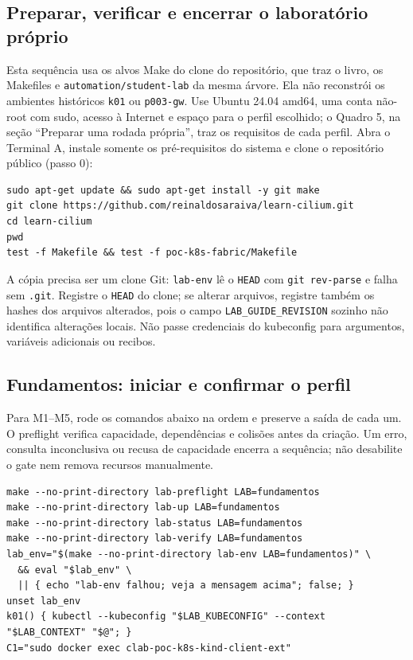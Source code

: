 \documentclass[12pt,openany,oneside,a4paper,chapter=TITLE,english,brazil]{abntex2}
\begin{document}
\begin{apendicesenv}

\chapter{Preparar, verificar e encerrar o laboratório próprio}\label{preparar-verificar-e-encerrar-o-laboratuxf3rio-pruxf3prio}

Esta sequência usa os alvos Make do clone do repositório, que traz o livro, os
Makefiles e \texttt{automation/\allowbreak{}student-{}\allowbreak{}lab} da mesma árvore. Ela não reconstrói os
ambientes históricos \texttt{k01} ou \texttt{p003-{}\allowbreak{}gw}. Use Ubuntu 24.04 amd64, uma conta
não-root com sudo, acesso à Internet e espaço para o perfil escolhido; o
Quadro 5, na seção ``Preparar uma rodada própria'', traz os requisitos de cada
perfil. Abra o Terminal A, instale somente os pré-requisitos do sistema e clone
o repositório público (passo 0):

\begin{verbatim}
sudo apt-get update && sudo apt-get install -y git make
git clone https://github.com/reinaldosaraiva/learn-cilium.git
cd learn-cilium
pwd
test -f Makefile && test -f poc-k8s-fabric/Makefile
\end{verbatim}

A cópia precisa ser um clone Git: \texttt{lab-{}\allowbreak{}env} lê o \texttt{HEAD} com \texttt{git rev-{}\allowbreak{}parse} e
falha sem \texttt{.\allowbreak{}git}. Registre o \texttt{HEAD} do clone; se alterar arquivos, registre
também os hashes dos arquivos alterados, pois o campo \texttt{LAB\_\allowbreak{}GUIDE\_\allowbreak{}REVISION}
sozinho não identifica alterações locais. Não passe credenciais do kubeconfig
para argumentos, variáveis adicionais ou recibos.

\section*{Fundamentos: iniciar e confirmar o perfil}\label{fundamentos-iniciar-e-confirmar-o-perfil}

Para M1--M5, rode os comandos abaixo na ordem e preserve a saída de cada um. O
preflight verifica capacidade, dependências e colisões antes da criação. Um
erro, consulta inconclusiva ou recusa de capacidade encerra a sequência; não
desabilite o gate nem remova recursos manualmente.

\begin{verbatim}
make --no-print-directory lab-preflight LAB=fundamentos
make --no-print-directory lab-up LAB=fundamentos
make --no-print-directory lab-status LAB=fundamentos
make --no-print-directory lab-verify LAB=fundamentos
lab_env="$(make --no-print-directory lab-env LAB=fundamentos)" \
  && eval "$lab_env" \
  || { echo "lab-env falhou; veja a mensagem acima"; false; }
unset lab_env
k01() { kubectl --kubeconfig "$LAB_KUBECONFIG" --context "$LAB_CONTEXT" "$@"; }
C1="sudo docker exec clab-poc-k8s-kind-client-ext"
\end{verbatim}


\end{apendicesenv}
\end{document}
